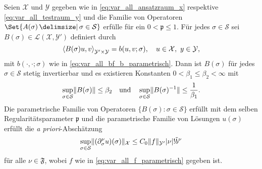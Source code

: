 \begin{Satz}
    \label{thm:kunoth:theorem21}
    Seien $\mathcal X$ und $\mathcal Y$ gegeben wie in \eqref{eq:var_all_ansatzraum_x} respektive \eqref{eq:var_all_testraum_y} und die Familie von Operatoren $\Set{ A(\sigma) \given \sigma \in \mathcal S }$ erfülle  für ein $0 < \mathfrak p \leq 1$.
    Für jedes $\sigma \in \mathcal S$ sei $B(\sigma) \in \mathcal L(\mathcal X, \mathcal Y')$ definiert durch
    \begin{equation}
        \label{eq:var_all_gross_b_parametrisch}
        \left\langle B(\sigma) u,v\right\rangle_{\mathcal Y' \times \mathcal Y} = b(u, v; \sigma), \quad u \in \mathcal X,~y \in \mathcal Y,
    \end{equation}
    mit $b(\cdot, \cdot; \sigma)$ wie in \eqref{eq:var_all_bf_b_parametrisch}.
    Dann ist $B(\sigma)$ für jedes $\sigma \in \mathcal S$ stetig invertierbar und es existieren Konstanten $0 < \beta_{1} \leq \beta_{2} < \infty$ mit
    \begin{equation}
        \label{eq:var_all_norm_B_und_B_inv_parametrisch}
        \sup_{\sigma \in \mathcal S} \lVert B(\sigma)\rVert \leq \beta_{2} \quad \text{und} \quad  \sup_{\sigma \in \mathcal S} \lVert B(\sigma)^{-1}\rVert \leq \frac{1}{\beta_{1}}.
    \end{equation}
    Die parametrische Familie von Operatoren $\{ B(\sigma) : \sigma \in \mathcal S \}$ erfüllt  mit dem selben Regularitätsparameter $\mathfrak p$ und die parametrische Familie von Lösungen $u(\sigma)$ erfüllt die \emph{a priori}-Abschätzung
    \begin{equation}
        \label{eq:var_all_a_priori_schranke}
        \sup_{\sigma \in \mathcal S} \lVert(\partial^{\nu}_{\sigma} u)(\sigma)\rVert_{\mathcal X} \leq C_{0} \lVert f\rVert_{\mathcal Y'} \lvert\nu\rvert! \tilde{b}^{\nu}
    \end{equation}
    für alle $\nu \in \mathfrak F$, wobei $f$ wie in \eqref{eq:var_all_f_parametrisch} gegeben ist.
\end{Satz}



